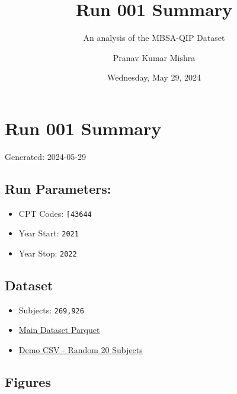 \documentclass[
  letterpaper,
  DIV=11,
  numbers=noendperiod]{scrartcl}
\title{Run 001 Summary}
\subtitle{An analysis of the MBSA-QIP Dataset}
\author{Pranav Kumar Mishra}
\date{Wednesday, May 29, 2024}
\providecommand{\tightlist}{%
  \setlength{\itemsep}{0pt}\setlength{\parskip}{0pt}}\usepackage{longtable,booktabs,array}
\renewcommand*\contentsname{Table of contents}
\newcommand\contentsname{Table of contents}
\begin{document}
\maketitle

\renewcommand*\contentsname{Table of contents}
{
\hypersetup{linkcolor=}
\setcounter{tocdepth}{3}
\tableofcontents
}
\section{Run 001 Summary}\label{run-001-summary}

Generated: 2024-05-29

\subsection{Run Parameters:}\label{run-parameters}

\begin{itemize}
\tightlist
\item
  CPT Codes: \texttt{{[}\textquotesingle{}43644\textquotesingle{}{]}}
\item
  Year Start: \texttt{2021}
\item
  Year Stop: \texttt{2022}
\end{itemize}

\subsection{Dataset}\label{dataset}

\begin{itemize}
\tightlist
\item
  Subjects: \texttt{269,926}
\item
  \href{data/analysis/bariatric/runs/run_001/tables/Run001_main_dataset.parquet}{Main
  Dataset Parquet}
\item
  \href{data/analysis/bariatric/runs/run_001/tables/Run001_demo_selected.csv}{Demo
  CSV - Random 20 Subjects}
\end{itemize}

\subsection{Figures}\label{figures}
\end{document}
